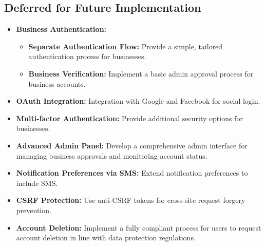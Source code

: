 \subsection{Deferred for Future Implementation}

\begin{itemize}[leftmargin=*]
  \item \textbf{Business Authentication:}
    \begin{itemize}
        \item \textbf{Separate Authentication Flow:} Provide a simple, tailored authentication process for businesses.
        \item \textbf{Business Verification:} Implement a basic admin approval process for business accounts.
    \end{itemize}
    \item \textbf{OAuth Integration:} Integration with Google and Facebook for social login.
    \item \textbf{Multi-factor Authentication:} Provide additional security options for businesses.
    \item \textbf{Advanced Admin Panel:} Develop a comprehensive admin interface for managing business approvals and monitoring account status.

    \item \textbf{Notification Preferences via SMS:} Extend notification preferences to include SMS.
    \item \textbf{CSRF Protection:} Use anti-CSRF tokens for cross-site request forgery prevention.
    \item \textbf{Account Deletion:} Implement a fully compliant process for users to request account deletion in line with data protection regulations.
\end{itemize}
